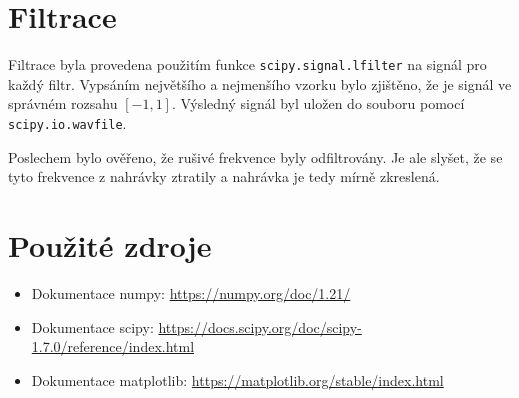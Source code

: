 \documentclass[11pt]{article}
\begin{document}
\section{Filtrace}
Filtrace byla provedena použitím funkce \texttt{scipy.signal.lfilter} na signál pro každý filtr. 
Vypsáním největšího a nejmenšího vzorku bylo zjištěno, že je signál ve správném rozsahu $[-1, 1]$.
Výsledný signál byl uložen do souboru pomocí \texttt{scipy.io.wavfile}.

Poslechem bylo ověřeno, že rušivé frekvence byly odfiltrovány. 
Je ale slyšet, že se tyto frekvence z nahrávky ztratily a nahrávka je tedy mírně zkreslená.

\section{Použité zdroje}
\begin{itemize}
    \item Dokumentace numpy: \url{https://numpy.org/doc/1.21/}
    \item Dokumentace scipy: \url{https://docs.scipy.org/doc/scipy-1.7.0/reference/index.html}
    \item Dokumentace matplotlib: \url{https://matplotlib.org/stable/index.html}
\end{itemize}
\end{document}
